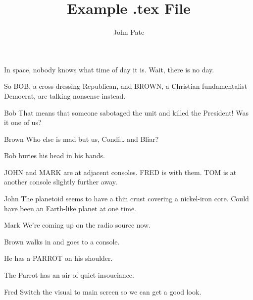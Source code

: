 \documentclass{screenplay}[2006/11/15]
\title{Example .tex File}
\author{John Pate}
\begin{document}
\coverpage


\fadein


In space, nobody knows what time of day it is.  Wait, there is no
day.

So BOB, a cross-dressing Republican, and BROWN, a Christian
fundamentalist Democrat, are talking nonsense instead.

\begin{dialogue}{Bob}
That means that someone
sabotaged the unit and killed the
President! Was it one of us?
\end{dialogue}
\begin{dialogue}{Brown}
Who else is mad but us, Condi\ldots
and Bliar?
\end{dialogue}

Bob buries his head in his hands.


JOHN and MARK are at adjacent consoles. FRED is with them. TOM
is at another console slightly further away.

\begin{dialogue}{John}
The planetoid seems to have a thin crust
covering a nickel-iron core. Could have
been an Earth-like planet at one time.
\end{dialogue}

\begin{dialogue}{Mark}
We're coming up on the radio source now.
\end{dialogue}

Brown walks in and goes to a console.

He has a PARROT on his shoulder.

The Parrot has an air of quiet insouciance.

\begin{dialogue}{Fred}
Switch the visual to main screen so we
can get a good look.\end{dialogue}
\end{document}
